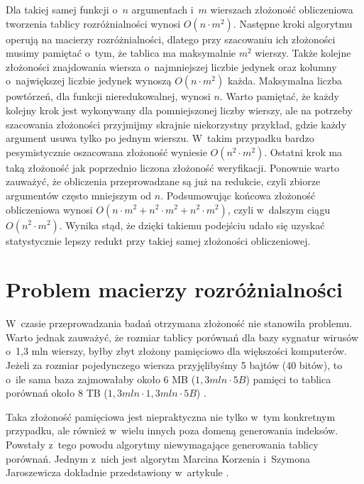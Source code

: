 Dla takiej samej funkcji o~$n$ argumentach i~$m$ wierszach złożoność obliczeniowa tworzenia tablicy rozróżnialności wynosi $O(n \cdot m^2)$.
Następne kroki algorytmu operują na macierzy rozróżnialności,
dlatego przy szacowaniu ich złożoności musimy pamiętać o~tym,
że tablica ma maksymalnie $m^2$ wierszy.
Także kolejne złożoności znajdowania wiersza o~najmniejszej liczbie jedynek oraz kolumny o~największej liczbie jedynek wynoszą $O(n \cdot m^2)$ każda.
Maksymalna liczba powtórzeń,
dla funkcji nieredukowalnej,
wynosi $n$.
Warto pamiętać,
że każdy kolejny krok jest wykonywany dla pomniejszonej liczby wierszy,
ale na potrzeby szacowania złożoności przyjmijmy skrajnie niekorzystny przykład,
gdzie każdy argument usuwa tylko po jednym wierszu.
W~takim przypadku bardzo pesymistycznie oszacowana złożoność wyniesie $O(n^2 \cdot m^2)$.
Ostatni krok ma taką złożoność jak poprzednio liczona złożoność weryfikacji.
Ponownie warto zauważyć,
że obliczenia przeprowadzane są już na redukcie,
czyli zbiorze argumentów często mniejszym od $n$.
Podsumowując końcowa złożoność obliczeniowa wynosi $O(n \cdot m^2 + n^2 \cdot m^2 + n^2 \cdot m^2)$,
czyli w~dalszym ciągu $O(n^2 \cdot m^2)$.
Wynika stąd,
że dzięki takiemu podejściu udało się uzyskać statystycznie lepszy redukt przy takiej samej złożoności obliczeniowej.


\section{Problem macierzy rozróżnialności}

W~czasie przeprowadzania badań otrzymana złożoność nie stanowiła problemu.
Warto jednak zauważyć,
że rozmiar tablicy porównań dla bazy sygnatur wirusów o~1,3 mln wierszy,
byłby zbyt złożony pamięciowo dla większości komputerów.
Jeżeli za rozmiar pojedynczego wiersza przyjęlibyśmy 5 bajtów (40 bitów), to o~ile sama baza zajmowałaby około 6 MB ($1,3mln \cdot 5B$) pamięci to tablica porównań około 8 TB ($1,3mln \cdot 1,3mln \cdot 5B$) .

Taka złożoność pamięciowa jest niepraktyczna nie tylko w~tym konkretnym przypadku,
ale również w~wielu innych poza domeną generowania indeksów.
Powstały z~tego powodu algorytmy niewymagające generowania tablicy porównań.
Jednym z~nich jest algorytm Marcina Korzenia i~Szymona Jaroszewicza dokładnie przedstawiony w~artykule \cite{without-matrix}.

